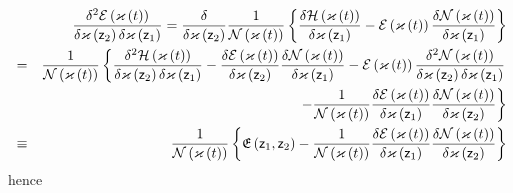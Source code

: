 \begin{eqnarray}
&&\frac{\delta ^{2}{\cal E}\left( {\cal \varkappa }\left( t\right) \right) }{%
\delta \varkappa \left( {\sf z}_{2}\right) \delta \varkappa \left( {\sf z}%
_{1}\right) }=\frac{\delta }{\delta \varkappa \left( {\sf z}_{2}\right) }%
\frac{1}{{\cal N}\left( {\cal \varkappa }\left( t\right) \right) }\left\{ 
\frac{\delta {\cal H}\left( \varkappa \left( t\right) \right) }{\delta
\varkappa \left( {\sf z}_{1}\right) }-{\cal E}\left( {\cal \varkappa }\left(
t\right) \right) \frac{\delta {\cal N}\left( \varkappa \left( t\right)
\right) }{\delta \varkappa \left( {\sf z}_{1}\right) }\right\}  \\
&=&\frac{1}{{\cal N}\left( {\cal \varkappa }\left( t\right) \right) }\left\{ 
\frac{\delta ^{2}{\cal H}\left( {\cal \varkappa }\left( t\right) \right) }{%
\delta \varkappa \left( {\sf z}_{2}\right) \delta \varkappa \left( {\sf z}%
_{1}\right) }-\frac{\delta {\cal E}\left( \varkappa \left( t\right) \right) 
}{\delta \varkappa \left( {\sf z}_{2}\right) }\frac{\delta {\cal N}\left(
\varkappa \left( t\right) \right) }{\delta \varkappa \left( {\sf z}%
_{1}\right) }-{\cal E}\left( {\cal \varkappa }\left( t\right) \right) \frac{%
\delta ^{2}{\cal N}\left( {\cal \varkappa }\left( t\right) \right) }{\delta
\varkappa \left( {\sf z}_{2}\right) \delta \varkappa \left( {\sf z}%
_{1}\right) }\right.  \\
&&\left. -\frac{1}{{\cal N}\left( {\cal \varkappa }\left( t\right) \right) }%
\frac{\delta {\cal E}\left( \varkappa \left( t\right) \right) }{\delta
\varkappa \left( {\sf z}_{1}\right) }\frac{\delta {\cal N}\left( \varkappa
\left( t\right) \right) }{\delta \varkappa \left( {\sf z}_{2}\right) }%
\right\}  \\
&\equiv &\frac{1}{{\cal N}\left( {\cal \varkappa }\left( t\right) \right) }%
\left\{ {\frak E}\left( {\sf z}_{1},{\sf z}_{2}\right) -\frac{1}{{\cal N}%
\left( {\cal \varkappa }\left( t\right) \right) }\frac{\delta {\cal E}\left(
\varkappa \left( t\right) \right) }{\delta \varkappa \left( {\sf z}%
_{1}\right) }\frac{\delta {\cal N}\left( \varkappa \left( t\right) \right) }{%
\delta \varkappa \left( {\sf z}_{2}\right) }\right\} 
\end{eqnarray}%
hence 
